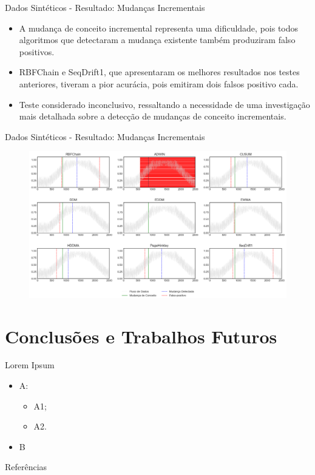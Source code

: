 \documentclass[10pt]{beamer}
\begin{document}
\begin{frame}{Dados Sintéticos - Resultado: Mudanças Incrementais}
    \begin{itemize}
        \item A mudança de conceito incremental representa uma dificuldade, pois todos algoritmos que detectaram a mudança existente também produziram falso positivos.
        \item RBFChain e SeqDrift1, que apresentaram os melhores resultados nos testes anteriores, tiveram a pior acurácia, pois emitiram dois falsos positivo cada.
        \item Teste considerado inconclusivo, ressaltando a necessidade de uma investigação mais detalhada sobre a detecção de mudanças de conceito incrementais.
    \end{itemize}
\end{frame}

\begin{frame}{Dados Sintéticos - Resultado: Mudanças Incrementais}
    \begin{figure}[t]
        \begin{center}
            \includegraphics[width=\textwidth]{imagens/incremental.png}
        \end{center}
    \end{figure}
\end{frame}

\section{Conclusões e Trabalhos Futuros}

\begin{frame}{Lorem Ipsum}
    \begin{itemize}
        \item<1 -> A:
        \begin{itemize}
            \item<2 -> A1;
            \item<2 -> A2.
        \end{itemize}
        \item<3 -> B
      \end{itemize}
\end{frame}

\begin{frame}[allowframebreaks]{Referências}

  
  

\end{frame}
\end{document}
